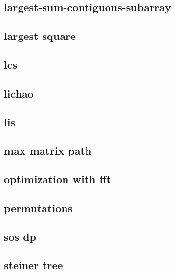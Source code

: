 \subsection{largest-sum-contiguous-subarray}
\raggedbottom
\hrulefill
\subsection{largest square}
\raggedbottom
\hrulefill
\subsection{lcs}
\raggedbottom
\hrulefill
\subsection{lichao}
\raggedbottom
\hrulefill
\subsection{lis}
\raggedbottom
\hrulefill
\subsection{max matrix path}
\raggedbottom
\hrulefill
\subsection{optimization with fft}
\raggedbottom
\hrulefill
\subsection{permutations}
\raggedbottom
\hrulefill
\subsection{sos dp}
\raggedbottom
\hrulefill
\subsection{steiner tree}
\raggedbottom
\hrulefill
